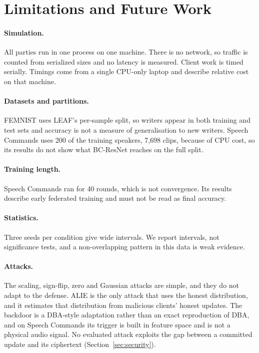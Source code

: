 \section{Limitations and Future Work}
\label{sec:limitations}

\paragraph{Simulation.}
All parties run in one process on one machine. There is no network, so traffic is counted from serialized sizes and no latency is measured. Client work is timed serially. Timings come from a single CPU-only laptop and describe relative cost on that machine.

\paragraph{Datasets and partitions.}
FEMNIST uses LEAF's per-sample split, so writers appear in both training and test sets and accuracy is not a measure of generalisation to new writers. Speech Commands uses 200 of the training speakers, 7{,}698 clips, because of CPU cost, so its results do not show what BC-ResNet reaches on the full split.

\paragraph{Training length.}
Speech Commands ran for 40 rounds, which is not convergence. Its results describe early federated training and must not be read as final accuracy.

\paragraph{Statistics.}
Three seeds per condition give wide intervals. We report intervals, not significance tests, and a non-overlapping pattern in this data is weak evidence.

\paragraph{Attacks.}
The scaling, sign-flip, zero and Gaussian attacks are simple, and they do not adapt to the defense. ALIE is the only attack that uses the honest distribution, and it estimates that distribution from malicious clients' honest updates. The backdoor is a DBA-style adaptation rather than an exact reproduction of DBA, and on Speech Commands its trigger is built in feature space and is not a physical audio signal. No evaluated attack exploits the gap between a committed update and its ciphertext (Section~\ref{sec:security}).

